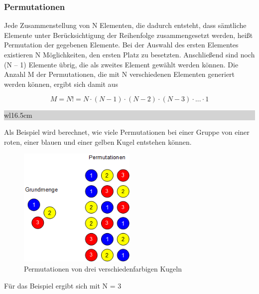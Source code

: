 \subsubsection{Permutationen}

\noindent Jede Zusammenstellung von N Elementen, die dadurch entsteht, dass s\"{a}mtliche Elemente unter Ber\"{u}cksichtigung der Reihenfolge zusammengesetzt werden, hei{\ss}t Permutation der gegebenen Elemente. Bei der Auswahl des ersten Elementes existieren N M\"{o}glichkeiten, den ersten Platz zu besetzten. Anschlie{\ss}end sind noch (N -- 1) Elemente \"{u}brig, die als zweites Element gew\"{a}hlt werden k\"{o}nnen. Die Anzahl M der Permutationen, die mit N verschiedenen Elementen generiert werden k\"{o}nnen, ergibt sich damit aus 

\begin{equation}\label{eq:twotwentythree}
M=N!=N\cdot (N-1)\cdot (N-2)\cdot (N-3)\cdot ...\cdot 1
\end{equation}

\noindent
\colorbox{lightgray}{%
%
\renewcommand\arraystretch{0.6}%
\begin{tabular}{ wl{16.5cm} }
{\selectfont
{}}
\end{tabular}%
}\bigskip


\noindent Als Beispiel wird berechnet, wie viele Permutationen bei einer Gruppe von einer roten, einer blauen und einer gelben Kugel entstehen k\"{o}nnen. 

\noindent 
\begin{figure}[H]
  \centerline{\includegraphics[width=0.5\textwidth]{Kapitel2/Bilder/image2}}
  \caption{Permutationen von drei verschiedenfarbigen Kugeln}
  \label{fig:Permutationen}
\end{figure}

\noindent Für das Beispiel ergibt sich mit N = 3 

